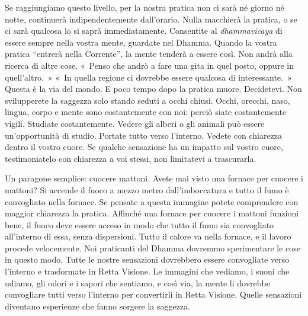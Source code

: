 Se raggiungiamo questo livello, per la nostra pratica non ci sarà né
giorno né notte, continuerà indipendentemente dall'orario. Nulla
macchierà la pratica, o se ci sarà qualcosa lo si saprà immediatamente.
Consentite al \emph{dhammavicaya} di essere sempre nella vostra mente,
guardate nel Dhamma. Quando la vostra pratica ``entrerà nella
Corrente'', la mente tenderà a essere così. Non andrà alla ricerca di
altre cose. «~Penso che andrò a fare una gita in quel posto, oppure in
quell'altro.~» «~In quella regione ci dovrebbe essere qualcosa di
interessante.~» Questa è la via del mondo. E poco tempo dopo la pratica
muore. Decidetevi. Non svilupperete la saggezza solo stando seduti a
occhi chiusi. Occhi, orecchi, naso, lingua, corpo e mente sono
costantemente con noi: perciò siate costantemente vigili. Studiate
costantemente. Vedere gli alberi o gli animali può essere un'opportunità
di studio. Portate tutto verso l'interno. Vedete con chiarezza dentro il
vostro cuore. Se qualche sensazione ha un impatto sul vostro cuore,
testimoniatelo con chiarezza a voi stessi, non limitatevi a trascurarla.

Un paragone semplice: cuocere mattoni. Avete mai visto una fornace per
cuocere i mattoni? Si accende il fuoco a mezzo metro dall'imboccatura e
tutto il fumo è convogliato nella fornace. Se pensate a questa immagine
potete comprendere con maggior chiarezza la pratica. Affinché una
fornace per cuocere i mattoni funzioni bene, il fuoco deve essere acceso
in modo che tutto il fumo sia convogliato all'interno di essa, senza
dispersioni. Tutto il calore va nella fornace, e il lavoro procede
velocemente. Noi praticanti del Dhamma dovremmo sperimentare le cose in
questo modo. Tutte le nostre sensazioni dovrebbero essere convogliate
verso l'interno e trasformate in Retta Visione. Le immagini che vediamo,
i suoni che udiamo, gli odori e i sapori che sentiamo, e così via, la
mente li dovrebbe convogliare tutti verso l'interno per convertirli in
Retta Visione. Quelle sensazioni diventano esperienze che fanno sorgere
la saggezza.

